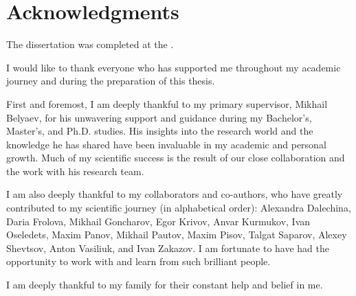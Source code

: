 

\newpage

\section*{Acknowledgments} 
The dissertation was completed at the {\thesisOrganizationEnNonTitle}.

I would like to thank everyone who has supported me throughout my academic journey and during the preparation of this thesis.

First and foremost, I am deeply thankful to my primary supervisor, Mikhail Belyaev, for his unwavering support and guidance during my Bachelor's, Master's, and Ph.D. studies. His insights into the research world and the knowledge he has shared have been invaluable in my academic and personal growth. Much of my scientific success is the result of our close collaboration and the work with his research team.

I am also deeply thankful to my collaborators and co-authors, who have greatly contributed to my scientific journey (in alphabetical order): Alexandra Dalechina, Daria Frolova, Mikhail Goncharov, Egor Krivov, Anvar Kurmukov, Ivan Oseledets, Maxim Panov, Mikhail Pautov, Maxim Pisov, Talgat Saparov, Alexey Shevtsov, Anton Vasiliuk, and Ivan Zakazov. I am fortunate to have had the opportunity to work with and learn from such brilliant people.

I am deeply thankful to my family for their constant help and belief in me.


